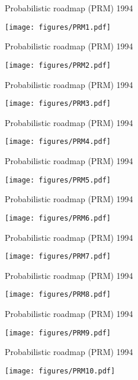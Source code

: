 %
%

\begin{frame} {Probabilistic roadmap (PRM) 1994}
\centerline {
  \texttt{[image: figures/PRM1.pdf]}
}
\end{frame}

\begin{frame} {Probabilistic roadmap (PRM) 1994}
\centerline {
  \texttt{[image: figures/PRM2.pdf]}
}
\end{frame}

\begin{frame} {Probabilistic roadmap (PRM) 1994}
\centerline {
  \texttt{[image: figures/PRM3.pdf]}
}
\end{frame}

\begin{frame} {Probabilistic roadmap (PRM) 1994}
\centerline {
  \texttt{[image: figures/PRM4.pdf]}
}
\end{frame}

\begin{frame} {Probabilistic roadmap (PRM) 1994}
\centerline {
  \texttt{[image: figures/PRM5.pdf]}
}
\end{frame}

\begin{frame} {Probabilistic roadmap (PRM) 1994}
\centerline {
  \texttt{[image: figures/PRM6.pdf]}
}
\end{frame}

\begin{frame} {Probabilistic roadmap (PRM) 1994}
\centerline {
  \texttt{[image: figures/PRM7.pdf]}
}
\end{frame}

\begin{frame} {Probabilistic roadmap (PRM) 1994}
\centerline {
  \texttt{[image: figures/PRM8.pdf]}
}
\end{frame}

\begin{frame} {Probabilistic roadmap (PRM) 1994}
\centerline {
  \texttt{[image: figures/PRM9.pdf]}
}
\end{frame}

\begin{frame} {Probabilistic roadmap (PRM) 1994}
\centerline {
  \texttt{[image: figures/PRM10.pdf]}
}
\end{frame}

